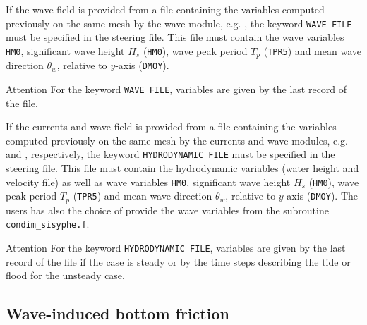 If the wave field is provided from a file containing the variables computed previously on the same mesh by the wave module, e.g. \tomawac, the keyword \texttt{WAVE FILE} must be specified in the \sisyphe steering file. This file must contain the wave variables \texttt{HM0}, significant wave height $H_s$ (\texttt{HM0}), wave peak period $T_p$ (\texttt{TPR5}) and mean wave direction $\theta_w$, relative to $y$-axis (\texttt{DMOY}).

\begin{bclogo}[couleur = blue!10, arrondi = 0.10, logo = \bcattention]{\textsf{Attention}}
For the keyword \texttt{WAVE FILE}, variables are given by the last record of the file.
\end{bclogo}

If the currents and wave field is provided from a file containing the variables computed previously on the same mesh by the currents and wave modules, e.g. \teldd and \tomawac, respectively, the keyword \texttt{HYDRODYNAMIC FILE} must be specified in the \sisyphe steering file. This file must contain the hydrodynamic variables (water height and velocity file) as well as wave variables \texttt{HM0}, significant wave height $H_s$ (\texttt{HM0}), wave peak period $T_p$ (\texttt{TPR5}) and mean wave direction $\theta_w$, relative to $y$-axis (\texttt{DMOY}). The users has also the choice of provide the wave variables from the subroutine \texttt{condim\_sisyphe.f}.  
 
\begin{bclogo}[couleur = blue!10, arrondi = 0.10, logo = \bcattention]{\textsf{Attention}}
For the keyword \texttt{HYDRODYNAMIC FILE}, variables are given by the last record of the file if the case is 
steady or by the time steps describing the tide or flood for the unsteady case. 
\end{bclogo}


\subsection{Wave-induced bottom friction}

